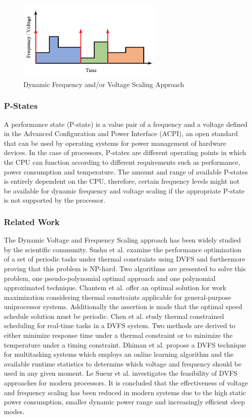 \begin{figure}[H]
  \centering
  \includegraphics[height=4cm]{figures/dvfs_sched}
  \caption[DVFS Schedules]{Dynamic Frequency and/or Voltage Scaling Approach}\label{fig:i_sched_dvfs}
\end{figure}
\subsubsection{P-States}
A performance state (P-state) is a value pair of a frequency and a voltage defined in the Advanced Configuration and Power Interface (ACPI), an open standard that can be used by operating systems for power management of hardware devices. In the case of processors, P-states are different operating points in which the CPU can function according to different requirements such as performance, power consumption and temperature. The amount and range of available P-states is entirely dependent on the CPU, therefore, certain frequency levels might not be available for dynamic frequency and voltage scaling if the appropriate P-state is not supported by the processor.
\subsubsection{Related Work}
The Dynamic Voltage and Frequency Scaling approach has been widely studied by the scientific community. Sushu et al. \cite{SushuZhang2007} examine the performance optimization of a set of periodic tasks under thermal constraints using DVFS and furthermore proving that this problem is NP-hard. Two algorithms are presented to solve this problem, one pseudo-polynomial optimal approach and one polynomial approximated technique. Chantem et al. \cite{Chantem2009} offer an optimal solution for work maximization considering thermal constraints applicable for general-purpose uniprocessor systems. Additionally the assertion is made that the optimal speed schedule solution must be periodic. Chen et al. \cite{Chen2009} study thermal constrained scheduling for real-time tasks in a DVFS system. Two methods are derived to either minimize response time under a thermal constraint or to minimize the temperature under a timing constraint. Dhiman et al. \cite{Dhiman2007} propose a DVFS technique for multitasking systems which employs an online learning algorithm and the available runtime statistics to determine which voltage and frequency should be used in any given moment. Le Sueur et al. \cite{LeSueur2010} investigates the feasibility of DVFS approaches for modern processors. It is concluded that the effectiveness of voltage and frequency scaling has been reduced in modern systems due to the high static power consumption, smaller dynamic power range and increasingly efficient sleep modes. 
